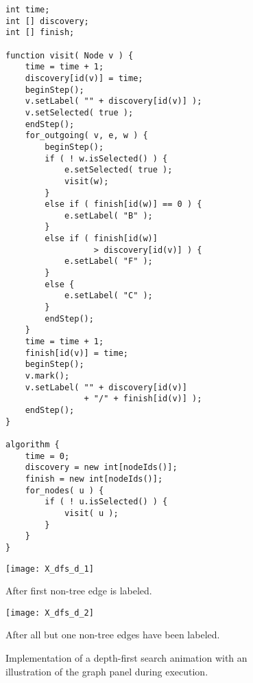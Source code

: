 
\begin{figure}

\begin{minipage}{0.5\textwidth}
\small
\begin{verbatim}
int time;
int [] discovery;
int [] finish;

function visit( Node v ) {
    time = time + 1;
    discovery[id(v)] = time;
    beginStep();
    v.setLabel( "" + discovery[id(v)] );
    v.setSelected( true );
    endStep();
    for_outgoing( v, e, w ) {
        beginStep();
        if ( ! w.isSelected() ) {
            e.setSelected( true );
            visit(w);
        }
        else if ( finish[id(w)] == 0 ) {
            e.setLabel( "B" );
        }
        else if ( finish[id(w)] 
                  > discovery[id(v)] ) {
            e.setLabel( "F" );
        }
        else {
            e.setLabel( "C" );
        }
        endStep();
    }
    time = time + 1;
    finish[id(v)] = time;
    beginStep();
    v.mark();
    v.setLabel( "" + discovery[id(v)]
                + "/" + finish[id(v)] );
    endStep();
}

algorithm {
    time = 0;
    discovery = new int[nodeIds()];
    finish = new int[nodeIds()];
    for_nodes( u ) {
        if ( ! u.isSelected() ) {
            visit( u );
        }
    }
}
\end{verbatim}
\end{minipage}
\begin{minipage}{0.49\textwidth}
\centering

\texttt{[image: X\_dfs\_d\_1]}

After first non-tree edge is labeled. 

\medskip

\texttt{[image: X\_dfs\_d\_2]}

After all but one non-tree edges have been labeled.

\end{minipage}
\caption{Implementation of a depth-first search animation
  with an illustration of the graph panel during execution.}
\label{fig:dfs}
\end{figure}
